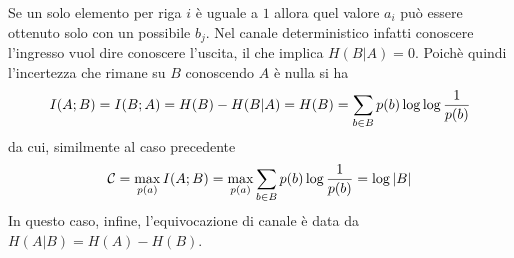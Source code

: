 Se un solo elemento per riga $i$ \`e uguale a $1$ allora quel valore $a_i$ pu\`o essere ottenuto solo con un possibile $b_j$. Nel canale deterministico infatti conoscere l’ingresso vuol dire conoscere l’uscita, il che implica $H(B|A) = 0$. Poich\`e quindi l’incertezza che rimane su $B$ conoscendo $A$ è nulla si ha 
\begin{equation*}
    I(A;B) = I(B;A) = H(B) - H(B|A) = H(B) = \sum_{b \in B} p(b) \log \log \frac{1}{p({b})}
\end{equation*}
da cui, similmente al caso precedente
\begin{equation}
    \mathcal{C} = \max_{p(a)} I(A;B) = \max_{p(a)} \sum_{b \in B} p(b) \log \frac{1}{p({b})} = \log |B|
\end{equation}
In questo caso, infine, l’equivocazione di canale è data da $H(A|B) = H(A) - H(B)$.

